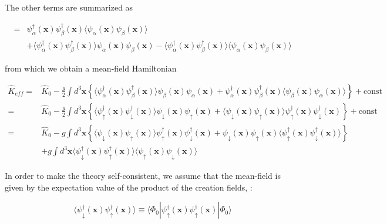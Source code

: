 The other terms are summarized as 

\[\begin{split}
 =&\psi^{\dagger}_{\alpha}(\bm{x})\psi^{\dagger}_{\beta}(\bm{x})\langle\psi_{\alpha}(\bm{x})\psi_{\beta}(\bm{x})\rangle\\
& + \langle\psi^{\dagger}_{\alpha}(\bm{x})\psi^{\dagger}_{\beta}(\bm{x})\rangle\psi_{\alpha}(\bm{x})\psi_{\beta}(\bm{x}) - \langle\psi^{\dagger}_{\alpha}(\bm{x})\psi^{\dagger}_{\beta}(\bm{x})\rangle\langle\psi_{\alpha}(\bm{x})\psi_{\beta}(\bm{x})\rangle \end{split} \]

from which we obtain a mean-field Hamiltonian 

\[\begin{split}\hat{K}_{eff} =& \hat{K}_0 - \frac{g}{2} \int d^3 \bm{x} \left\{\langle\psi^{\dagger}_{\alpha}(\bm{x})\psi^{\dagger}_{\beta}(\bm{x})\rangle\psi_{\beta}(\bm{x})\psi_{\alpha}(\bm{x}) +\psi^{\dagger}_{\alpha}(\bm{x})\psi^{\dagger}_{\beta}(\bm{x}) \langle\psi_{\beta}(\bm{x})\psi_{\alpha}(\bm{x})\rangle\right\} + \text{const}\\
=& \hat{K}_0 - \frac{g}{2} \int d^3 \bm{x} \left\{\langle\psi^{\dagger}_{\uparrow}(\bm{x})\psi^{\dagger}_{\downarrow}(\bm{x})\rangle\psi_{\downarrow}(\bm{x})\psi_{\uparrow}(\bm{x}) +\langle\psi_{\downarrow}(\bm{x})\psi_{\uparrow}(\bm{x})\rangle\psi^{\dagger}_{\uparrow}(\bm{x})\psi^{\dagger}_{\downarrow}(\bm{x}) \right\} + \text{const}\\
 =&\hat{K}_0 - g\int d^3\bm{x} \left\{\langle\psi_{\downarrow}(\bm{x})\psi_{\uparrow}(\bm{x})\rangle\psi^{\dagger}_{\uparrow}(\bm{x})\psi^{\dagger}_{\downarrow}(\bm{x}) +\psi_{\downarrow}(\bm{x})\psi_{\uparrow}(\bm{x})\langle\psi^{\dagger}_{\uparrow}(\bm{x})\psi^{\dagger}_{\downarrow}(\bm{x})\rangle \right\}\\
&+g\int d^3 \bm{x} \langle\psi^{\dagger}_{\downarrow}(\bm{x})\psi^{\dagger}_{\uparrow}(\bm{x})\rangle \langle\psi_{\uparrow}(\bm{x})\psi_{\downarrow}(\bm{x})\rangle
 \end{split}\]

In order to make the theory self-consistent, we assume that the mean-field is given by the expectation value of the product of the creation fields, :

\[\langle\psi_{\downarrow}^\dagger(\bm{x})\psi_\uparrow^\dagger(\bm{x})\rangle \equiv \langle\Phi_0|\psi_\uparrow^\dagger(\bm{x})\psi_\uparrow^\dagger(\bm{x})|\Phi_0\rangle \]

